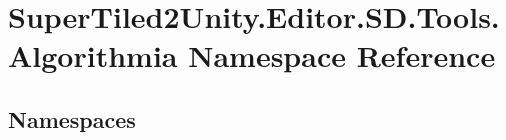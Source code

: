 \hypertarget{namespace_super_tiled2_unity_1_1_editor_1_1_s_d_1_1_tools_1_1_algorithmia}{}\section{Super\+Tiled2\+Unity.\+Editor.\+S\+D.\+Tools.\+Algorithmia Namespace Reference}
\label{namespace_super_tiled2_unity_1_1_editor_1_1_s_d_1_1_tools_1_1_algorithmia}
\subsection*{Namespaces}
\begin{DoxyCompactItemize}
\end{DoxyCompactItemize}
